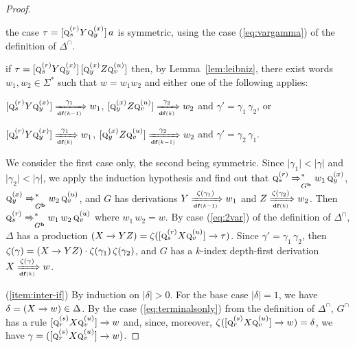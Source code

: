 \documentclass[final]{llncs}
\newcommand{\arrow}[2]{\xrightarrow{{\scriptscriptstyle #1}}}
\def\len#1{{\vert{#1}\vert}}
\def\pat{{\mathbf{b}}}
\def\df#1{\scriptscriptstyle\mathbf{df}(#1)}
\begin{document}
\begin{proof}
\begin{compactenum}
    \item the case $\tau = [\textsc{q}^{(r)}_{s}
      Y \textsc{q}^{(x)}_{y}] \, a$ is symmetric, using the case
      (\ref{eq:vargamma}) of the definition of $\Delta^\cap$.  \item
      if $\tau = [\textsc{q}^{(r)}_{s} Y \textsc{q}^{(x)}_y]\,
      [\textsc{q}^{(x)}_y Z \textsc{q}^{(u)}_v]$ then, by
      Lemma~\ref{lem:leibniz}, there exist words $w_1,
      w_2 \in \Sigma^*$ such that $w = w_1w_2$ and either one of the
      following applies:
			\begin{compactenum} 
      \item $[\textsc{q}^{(r)}_{s}
      Y \textsc{q}^{(x)}_y] \xRightarrow[\df{k-1}]{\gamma_1} w_1$, 
      $[\textsc{q}^{(x)}_y Z \textsc{q}^{(u)}_v] \xRightarrow[\df{k}]{\gamma_2} w_2$ and
      $\gamma'=\gamma_1\,\gamma_2$, or

      \item $[\textsc{q}^{(r)}_{s} Y \textsc{q}^{(x)}_y] \xRightarrow[\df{k}]{\gamma_1} w_1$, 
      $[\textsc{q}^{(x)}_y Z \textsc{q}^{(u)}_v] \xRightarrow[\df{k-1}]{\gamma_2} w_2$
      and $\gamma' = \gamma_2\, \gamma_1$.
      \end{compactenum} 
			We consider the first case only, the second
      being symmetric.  Since $\len{\gamma_1} < \len{\gamma}$ and
      $\len{\gamma_2} < \len{\gamma}$, we apply the induction
      hypothesis and find out that
      $\textsc{q}^{(r)}_{s} \xRightarrow{}_{G^\pat}^* w_1\, \textsc{q}^{(x)}_y$,
      $\textsc{q}^{(x)}_y \xRightarrow{}_{G^\pat}^* w_2\, \textsc{q}^{(u)}_v$, and $G$ has derivations
      $Y \xRightarrow[\df{k-1}]{\zeta(\gamma_1)} w_1$ and
      $Z \xRightarrow[\df{k}]{\zeta(\gamma_2)} w_2$. Then
			$\textsc{q}^{(r)}_{s} \xRightarrow{}_{G^\pat}^* w_1\, w_2 \,\textsc{q}^{(u)}_v$ where \(w_1\, w_2 = w \). By
      case (\ref{eq:2var}) of the definition of $\Delta^\cap$,
      $\Delta$ has a production $(X \arrow{}{} YZ)
      = \zeta([\textsc{q}^{(r)}_{s}
      X \textsc{q}^{(u)}_v] \arrow{}{} \tau)$. Since $\gamma'
      = \gamma_1 \, \gamma_2$, then $\zeta(\gamma) = (X \arrow{}{}
      YZ) \cdot \zeta(\gamma_1) \, \zeta(\gamma_2)$, and $G$ has a
      $k$-index depth-first derivation
      $X \xRightarrow[\df{k}]{\zeta(\gamma)} w$. \end{compactenum}
 
\noindent(\ref{item:inter-if}) By induction on $\len{\delta} > 0$. For the
base case $\len{\delta} = 1$, we have $\delta = (X \arrow{}{} w) \in
\Delta$. By the case (\ref{eq:terminalsonly}) from the definition of
$\Delta^\cap$, $G^\cap$ has a rule $[\textsc{q}^{(s)}_r X
  \textsc{q}_{v}^{(u)}] \arrow{}{} w$ and, since, moreover,
$\zeta([\textsc{q}^{(s)}_r X \textsc{q}_{v}^{(u)}] \arrow{}{} w) =
\delta$, we have $\gamma = ([\textsc{q}^{(s)}_r X
  \textsc{q}_{v}^{(u)}] \arrow{}{} w)$.


\end{proof}
\end{document}
